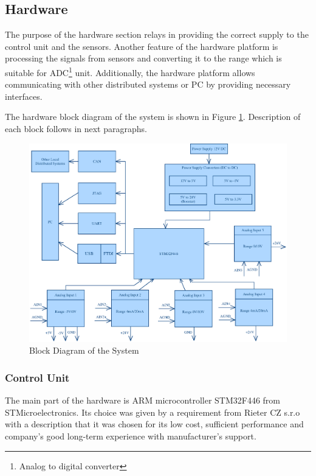 \documentclass[twoside]{ctuthesis}
\theoremstyle{plain}
\theoremstyle{definition}
\theoremstyle{note}
\begin{document}
\subsection{Hardware}
The purpose of the hardware section relays in providing the correct supply to the control unit and the sensors. Another feature of the hardware platform is processing the signals from sensors and converting it to the range which is suitable for ADC\footnote{Analog to digital converter} unit. Additionally, the hardware platform allows communicating with other distributed systems or PC by providing necessary interfaces. 


The hardware block diagram of the system is shown in Figure \ref{fig:blockDiagram_HW}. Description of each block follows in next paragraphs.
\begin{figure}[h]
	\centering
	\includegraphics[width=1.0\textwidth]{blockSchematic4.eps}
	\caption{Block Diagram of the System}
	\label{fig:blockDiagram_HW}
\end{figure}

\subsubsection{Control Unit}
\label{sec:microController}
	The main part of the hardware is ARM microcontroller STM32F446 from STMicroelectronics. Its choice was given by a requirement from Rieter CZ s.r.o with a description that it was chosen for its low cost, sufficient performance and company's good long-term experience with manufacturer's support. 
	
\end{document}
